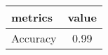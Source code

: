 \begin{tabular}{|l|c|}
\hline
 metrics &  value \\ \hline

Accuracy &   0.99 \\ \hline

\end{tabular}
